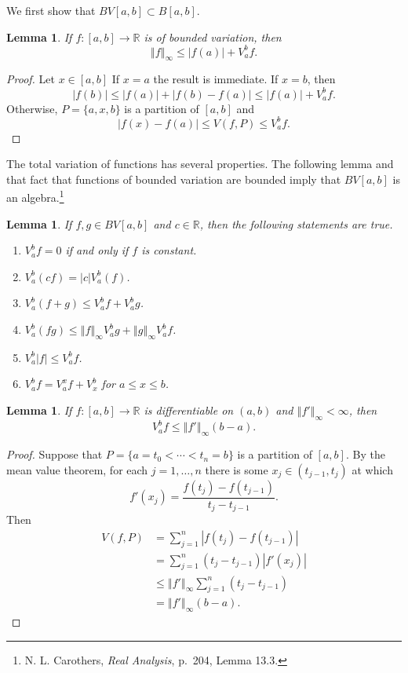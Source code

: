 \documentclass{article}
\newcommand{\norm}[1]{\left\Vert #1 \right\Vert}
\newtheorem{lemma}[theorem]{Lemma}
\theoremstyle{definition}
\begin{document}
We first show that $BV[a,b] \subset B[a,b]$.

\begin{lemma}
If $f:[a,b] \to \mathbb{R}$ is of bounded variation, then
\[
\norm{f}_\infty \leq |f(a)|+V_a^b f.
\]
\label{supremum}
\end{lemma}
\begin{proof}
Let $x \in [a,b]$ If $x=a$ the result is immediate. If $x=b$, then
\[
|f(b)| \leq |f(a)|+|f(b)-f(a)| \leq |f(a)|+V_a^b f.
\]
Otherwise, $P=\{a,x,b\}$ is a partition of $[a,b]$ and
\[
|f(x)-f(a)| \leq V(f,P) \leq V_a^b f.
\]
\end{proof}

The total variation of functions has several properties. The following
lemma and that fact that functions of bounded variation are bounded imply that $BV[a,b]$ is an algebra.\footnote{N. L. Carothers, {\em Real Analysis}, p.~204, Lemma 13.3.} 

\begin{lemma}
If $f,g \in BV[a,b]$ and $c \in \mathbb{R}$, then the following statements are true.
\begin{enumerate}
\item $V_a^b f=0$ if and only if $f$ is constant.
\item $V_a^b(cf)=|c| V_a^b(f)$.
\item $V_a^b(f+g) \leq V_a^b f+V_a^b g$.
\item $V_a^b(fg) \leq \norm{f}_\infty V_a^b g+\norm{g}_\infty V_a^b f$.
\item $V_a^b |f| \leq V_a^b f$.
\item $V_a^b f = V_a^x f + V_x^b$ for $a \leq x \leq b$.
\end{enumerate}
\label{norm}
\end{lemma}


\begin{lemma}
If $f:[a,b] \to \mathbb{R}$ is differentiable on $(a,b)$ and $\norm{f'}_\infty < \infty$, then
\[
V_a^b f \leq \norm{f'}_\infty (b-a).
\]
\end{lemma}
\begin{proof}
Suppose that $P=\{a=t_0<\cdots<t_n=b\}$ is a partition of $[a,b]$. 
By the mean value theorem, 
for each $j=1,\ldots,n$ there is some $x_j \in (t_{j-1},t_j)$ at which
\[
f'(x_j)=\frac{f(t_j)-f(t_{j-1})}{t_j-t_{j-1}}.
\]
Then
\begin{align*}
V(f,P)&=\sum_{j=1}^n |f(t_j)-f(t_{j-1})|\\
&=\sum_{j=1}^n (t_j-t_{j-1})|f'(x_j)|\\
&\leq \norm{f'}_\infty \sum_{j=1}^n (t_j-t_{j-1})\\
&=\norm{f'}_\infty (b-a).
\end{align*}
\end{proof}
\end{document}
